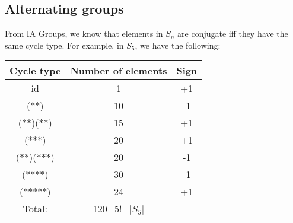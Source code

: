 \documentclass[egregdoesnotlikesansseriftitles,a4paper]{scrartcl}
\begin{document}
\subsection{Alternating groups}
From IA Groups, we know that elements in $S_{n}$ are conjugate iff they have the same cycle type. For example, in $S_5$, we have the following:
\begin{center}
\begin{tabular}{|c|c|c|}
     \hline
     Cycle type & Number of elements & Sign\\
     \hline
     id &1&+1\\
     ($\ast$$\ast$)&10&-1\\
     ($\ast$$\ast$)($\ast$$\ast$)&15&+1\\
     ($\ast$$\ast$$\ast$)& 20&+1\\
     ($\ast$$\ast$)($\ast$$\ast$$\ast$) & 20&-1\\
     ($\ast$$\ast$$\ast$$\ast$) & 30&-1\\
     ($\ast$$\ast$$\ast$$\ast$$\ast$) & 24&+1\\
     \hline
     Total:& 120=5!=$|S_5 |$&\\
     \hline
\end{tabular}
\end{center}
\end{document}
